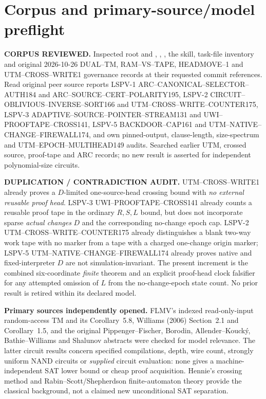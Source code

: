 \documentclass[11pt]{article}
\begin{document}
\section{Corpus and primary-source/model preflight}
\textbf{CORPUS REVIEWED.} Inspected root  and
, , , the
 skill, task-file inventory and original
2026-10-26 DUAL--TM, RAM--VS--TAPE, HEADMOVE--1 and
UTM--CROSS--WRITE1 governance records at their requested commit references.
Read original peer source reports LSPV-1 ARC--CANONICAL--SELECTOR--AUTH184
and ARC--SOURCE--CERT--POLARITY195, LSPV-2
CIRCUIT--OBLIVIOUS--INVERSE--SORT166 and
UTM--CROSS--WRITE--COUNTER175, LSPV-3
ADAPTIVE--SOURCE--POINTER--STREAM131 and
UWI--PROOFTAPE--CROSS141, LSPV-5 BACKDOOR--CAP161 and
UTM--NATIVE--CHANGE--FIREWALL174, and own pinned-output,
clause-length, size-spectrum and UTM--EPOCH--MULTIHEAD149 audits.
Searched earlier UTM, crossed source, proof-tape and ARC records; no
new result is asserted for independent polynomial-size circuits.

\textbf{DUPLICATION / CONTRADICTION AUDIT.}
UTM--CROSS--WRITE1 already proves a $D$-limited one-source-head crossing
bound with \emph{no external reusable proof head}.  LSPV-3
UWI--PROOFTAPE--CROSS141 already counts a reusable proof tape in the
ordinary $R,S,L$ bound, but does not incorporate sparse \emph{actual changes}
$D$ and the corresponding no-change epoch cap. LSPV-2
UTM--CROSS--WRITE--COUNTER175 already distinguishes a blank two-way work
tape with no marker from a tape with a charged one-change origin marker;
LSPV-5 UTM--NATIVE--CHANGE--FIREWALL174 already proves native and
fixed-interpreter $D$ are not simulation-invariant. The present
increment is the combined six-coordinate \emph{finite} theorem and an
explicit proof-head clock falsifier for any attempted omission of $L$
from the no-change-epoch state count.
No prior result is retired within its declared model.

\textbf{Primary sources independently opened.} FLMV's indexed read-only-input
random-access TM and its Corollary~5.8, Williams (2006) Section~2.1 and
Corollary~1.5, and the original Pippenger--Fischer, Borodin,
Allender--Kouck\'y, Bathie--Williams and Shalunov abstracts were checked
for model relevance. The latter circuit results concern specified
compilations, depth, wire count, strongly uniform NAND circuits or
\emph{supplied} circuit evaluation: none gives a machine-independent
SAT lower bound or cheap proof acquisition. Hennie's crossing method and
Rabin--Scott/Shepherdson finite-automaton theory provide the classical
background, not a claimed new unconditional SAT separation.
\end{document}
